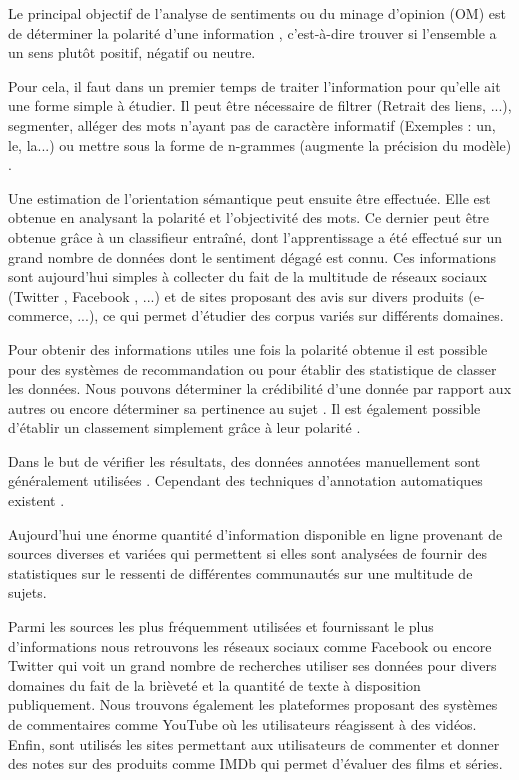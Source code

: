 \documentclass[8pt]{article}
\begin{document}
\begin{multicols}{2}
\par Le principal objectif de l’analyse de sentiments ou du minage d’opinion (OM) est de déterminer la polarité d’une information \cite{ressource6}, c’est-à-dire trouver si l’ensemble a un sens plutôt positif, négatif ou neutre.
\par Pour cela, il faut dans un premier temps de traiter l’information pour qu’elle ait une forme simple à étudier. Il peut être nécessaire de filtrer (Retrait des liens, ...), segmenter, alléger des mots n’ayant pas de caractère informatif (Exemples : un, le, la...) ou mettre sous la forme de n-grammes (augmente la précision du modèle) \cite{ressource10}.
\par Une estimation de l’orientation sémantique peut ensuite être effectuée. Elle est obtenue en analysant la polarité et l’objectivité des mots. Ce dernier peut être obtenue grâce à un classifieur entraîné, dont l’apprentissage a été effectué sur un grand nombre de données dont le sentiment dégagé est connu. Ces informations sont aujourd’hui  simples à collecter \cite{ressource10} du fait de la multitude de réseaux sociaux (Twitter \cite{ressource11}, Facebook \cite{ressource27}, ...) et de sites proposant des avis sur divers produits (e-commerce, ...), ce qui permet d’étudier des corpus variés sur différents domaines.
\par Pour obtenir des informations utiles une fois la polarité obtenue il est possible pour des systèmes de recommandation ou pour établir des statistique de classer les données. Nous pouvons déterminer la crédibilité d’une donnée par rapport aux autres \cite{ressource28} ou encore déterminer sa pertinence au sujet \cite{ressource18}. Il est également possible d’établir un classement  simplement grâce à leur polarité \cite{ressource4}.
\par Dans le but de vérifier les résultats, des données annotées manuellement sont généralement utilisées \cite{ressource30}. Cependant des techniques d’annotation automatiques existent \cite{ressource19}.

\par Aujourd'hui une énorme quantité d’information disponible en ligne provenant de sources diverses et variées qui permettent si elles sont analysées de fournir des statistiques sur le ressenti de différentes communautés sur une multitude de sujets.
\par Parmi les sources les plus fréquemment utilisées et fournissant le plus d’informations nous retrouvons les réseaux sociaux comme Facebook \cite{ressource27} ou encore Twitter \cite{ressource10} \cite{ressource11} \cite{ressource14} \cite{ressource17} \cite{ressource19} \cite{ressource22} \cite{ressource23} \cite{ressource24} \cite{ressource28} qui voit un grand nombre de recherches utiliser ses données pour divers domaines du fait de la brièveté et la quantité de texte à disposition publiquement. Nous trouvons également les plateformes proposant des systèmes de commentaires comme YouTube\cite{ressource30}\cite{ressource22} où les utilisateurs réagissent à des vidéos. Enfin, sont utilisés les sites permettant aux utilisateurs de commenter et donner des notes sur des produits comme IMDb \cite{ressource1} qui permet d’évaluer des films et séries.



\end{multicols}
\end{document}
